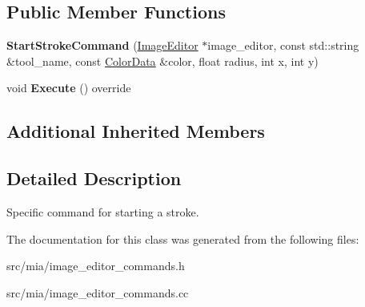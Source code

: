 \subsection*{Public Member Functions}
\begin{DoxyCompactItemize}
\item 
\mbox{\label{classimage__tools_1_1StartStrokeCommand_a93eb3abdeb81243587dcadcad6e6cfe4}} 
{\bfseries Start\+Stroke\+Command} (\hyperlink{classimage__tools_1_1ImageEditor}{Image\+Editor} $\ast$image\+\_\+editor, const std\+::string \&tool\+\_\+name, const \hyperlink{classimage__tools_1_1ColorData}{Color\+Data} \&color, float radius, int x, int y)
\item 
\mbox{\label{classimage__tools_1_1StartStrokeCommand_ad4fc2466e4c0370d9437b325ddbd6585}} 
void {\bfseries Execute} () override
\end{DoxyCompactItemize}
\subsection*{Additional Inherited Members}


\subsection{Detailed Description}
Specific command for starting a stroke. 

The documentation for this class was generated from the following files\+:\begin{DoxyCompactItemize}
\item 
src/mia/image\+\_\+editor\+\_\+commands.\+h\item 
src/mia/image\+\_\+editor\+\_\+commands.\+cc\end{DoxyCompactItemize}
